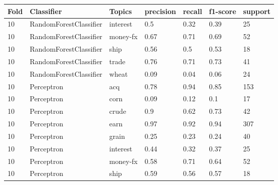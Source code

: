 \documentclass{article}
\begin{document}
\begin{table}[h]
\begin{tabular}{lllllll}
\textbf{Fold} & \textbf{Classifier}    & \textbf{Topics} & \textbf{precision} & \textbf{recall} & \textbf{f1-score} & \textbf{support} \\ \hline
10            & RandomForestClassifier & interest        & 0.5                & 0.32            & 0.39              & 25               \\
10            & RandomForestClassifier & money-fx        & 0.67               & 0.71            & 0.69              & 52               \\
10            & RandomForestClassifier & ship            & 0.56               & 0.5             & 0.53              & 18               \\
10            & RandomForestClassifier & trade           & 0.76               & 0.71            & 0.73              & 41               \\
10            & RandomForestClassifier & wheat           & 0.09               & 0.04            & 0.06              & 24               \\
10            & Perceptron             & acq             & 0.78               & 0.94            & 0.85              & 153              \\
10            & Perceptron             & corn            & 0.09               & 0.12            & 0.1               & 17               \\
10            & Perceptron             & crude           & 0.9                & 0.62            & 0.73              & 42               \\
10            & Perceptron             & earn            & 0.97               & 0.92            & 0.94              & 307              \\
10            & Perceptron             & grain           & 0.25               & 0.23            & 0.24              & 40               \\
10            & Perceptron             & interest        & 0.44               & 0.32            & 0.37              & 25               \\
10            & Perceptron             & money-fx        & 0.58               & 0.71            & 0.64              & 52               \\
10            & Perceptron             & ship            & 0.59               & 0.56            & 0.57              & 18               \\

\end{tabular}
\end{table}
\end{document}
